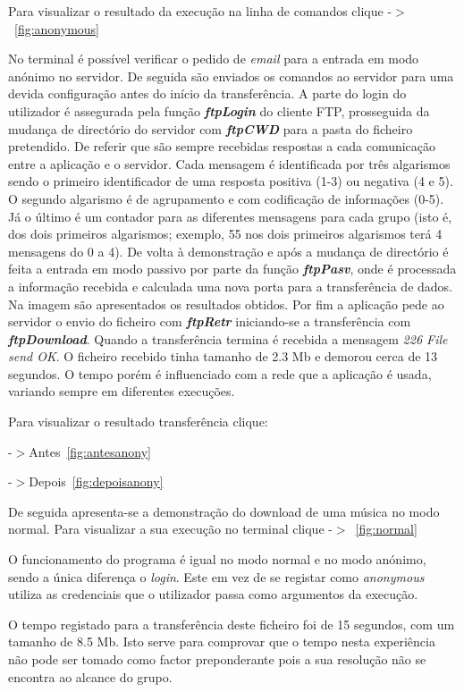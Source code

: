 \documentclass[a4paper]{article}
\begin{document}
Para visualizar o resultado da execução na linha de comandos clique -$>$~\autoref{fig:anonymous}

No terminal é possível verificar o pedido de \textit{email} para a entrada em modo anónimo no servidor. De seguida são enviados os comandos ao servidor para uma devida configuração antes do início da transferência. A parte do login do utilizador é assegurada pela função \textbf{\textit{ftpLogin}} do cliente FTP, prosseguida da mudança de directório do servidor com \textbf{\textit{ftpCWD}} para a pasta do ficheiro pretendido. De referir que são sempre recebidas respostas a cada comunicação entre a aplicação e o servidor. Cada mensagem é identificada por três algarismos sendo o primeiro identificador de uma resposta positiva (1-3) ou negativa (4 e 5). O segundo algarismo é de agrupamento e com codificação de informações (0-5). Já o último é um contador para as diferentes mensagens para cada grupo (isto é, dos dois primeiros algarismos; exemplo, 55 nos dois primeiros algarismos terá 4 mensagens do 0 a 4).
De volta à demonstração e após a mudança de directório é feita a entrada em modo passivo por parte da função \textbf{\textit{ftpPasv}}, onde é processada a informação recebida e calculada uma nova porta para a transferência de dados. Na imagem são apresentados os resultados obtidos. Por fim a aplicação pede ao servidor o envio do ficheiro com \textbf{\textit{ftpRetr}} iniciando-se a transferência com \textbf{\textit{ftpDownload}}. Quando a transferência termina é recebida a mensagem \textit{226 File send OK}. O ficheiro recebido tinha tamanho de 2.3 Mb e demorou cerca de 13 segundos. O tempo porém é influenciado com a rede que a aplicação é usada, variando sempre em diferentes execuções.

Para visualizar o resultado transferência clique:

-$>$Antes~\autoref{fig:antesanony}

-$>$Depois~\autoref{fig:depoisanony}

\pagebreak

De seguida apresenta-se a demonstração do download de uma música no modo normal.
Para visualizar a sua execução no terminal clique -$>$~\autoref{fig:normal}

O funcionamento do programa é igual no modo normal e no modo anónimo, sendo a única diferença o \textit{login}. Este em vez de se registar como \textit{anonymous} utiliza as credenciais que o utilizador passa como argumentos da execução.

O tempo registado para a transferência deste ficheiro foi de 15 segundos, com um tamanho de 8.5 Mb. Isto serve para comprovar que o tempo nesta experiência não pode ser tomado como factor preponderante pois a sua resolução não se encontra ao alcance do grupo.
\end{document}
